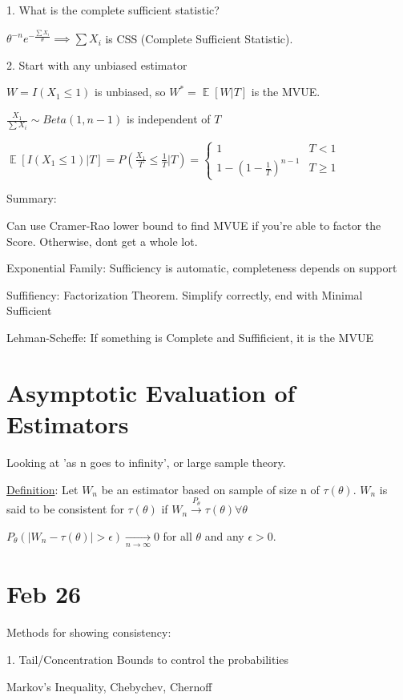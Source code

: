 \documentclass{article}
\DeclareMathOperator{\EX}{\mathbb{E}} %
\let\Oldsum=\sum
\renewcommand{\sum}{\Oldsum\limits}
\begin{document}
1. What is the complete sufficient statistic?

$\theta^{-n}e^{-\frac{\sum X_i}{\theta}} \implies \sum X_i$ is CSS (Complete Sufficient Statistic). 

2. Start with any unbiased estimator

$W = I(X_1 \le 1)$ is unbiased, so $W^* = \EX[W|T]$ is the MVUE.

$\frac{X_1}{\sum X_i} \sim Beta(1, n-1)$ is independent of $T$

$\EX[I(X_1 \le 1)|T] = P(\frac{X_1}{T} \le \frac{1}{T} | T) = \begin{cases} 1 & T < 1 \\ 1-(1-\frac{1}{T})^{n-1} & T \ge 1 \end{cases}$


Summary:

Can use Cramer-Rao lower bound to find MVUE if you're able to factor the Score. Otherwise, dont get a whole lot.

Exponential Family: Sufficiency is automatic, completeness depends on support

Suffifiency: Factorization Theorem. Simplify correctly, end with Minimal Sufficient

Lehman-Scheffe: If something is Complete and Suffificient, it is the MVUE


\section{Asymptotic Evaluation of Estimators}

Looking at 'as n goes to infinity', or large sample theory.

\underline{Definition}: Let $W_n$ be an estimator based on sample of size n of $\tau(\theta)$. $W_n$ is said to be consistent for $\tau(\theta)$ if $W_n \overset{P_{\theta}}{\to} \tau(\theta) \forall \theta$

$P_{\theta}(|W_n - \tau(\theta)| > \epsilon) \underset{n \to \infty}{\to} 0$ for all $\theta$ and any $\epsilon > 0$. 


\section{Feb 26}

Methods for showing consistency: 

1. Tail/Concentration Bounds to control the probabilities

Markov's Inequality, Chebychev, Chernoff
\end{document}
